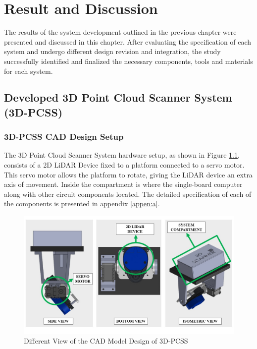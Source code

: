 \renewcommand{\thechapter}{\Roman{chapter}}
\chapter{Result and Discussion}
\renewcommand{\thechapter}{\arabic{chapter}}
\label{ch:Result and Discussion}
\thispagestyle{empty}

The results of the system development outlined in the previous chapter were presented and discussed in this chapter. After evaluating the specification of each system and undergo different design revision and integration, the study successfully identified and finalized the necessary components, tools and materials for each system.

\section{Developed 3D Point Cloud Scanner System (3D-PCSS)}

\subsection{3D-PCSS CAD Design Setup}

The 3D Point Cloud Scanner System hardware setup, as shown in Figure \ref{ch4:fig:cad_storage_bin}, consists of a 2D LiDAR Device fixed to a platform connected to a servo motor. This servo motor allows the platform to rotate, giving the LiDAR device an extra axis of movement. Inside the compartment is where the single-board computer along with other circuit components located. The detailed specification of each of the components is presented in appendix \ref{appen:a}.

\begin{figure}[H]
	\centering
	\includegraphics[width=1\textwidth]{Figures/3d-pcss-cad-design}
	\caption{Different View of the CAD Model Design of 3D-PCSS}
	\label{ch4:fig:cad_storage_bin}
\end{figure}

